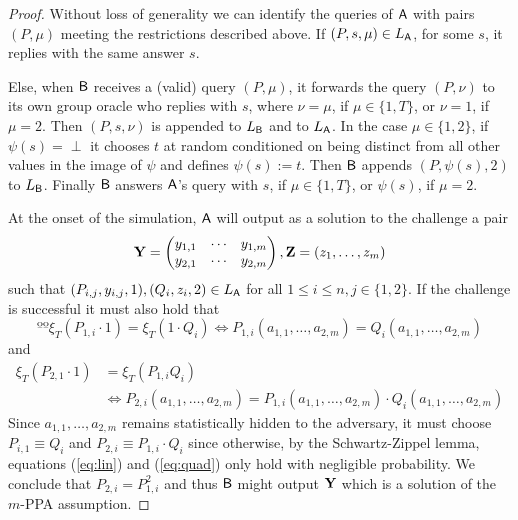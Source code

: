 \begin{proof}
Without loss of generality we can identify the queries of $\mathsf{A}$ with 
pairs $(P,\mu)$ meeting the restrictions described above. If $(P,s,\mu)\in L_{\mathsf{A}}$, for some $s$, it replies with the same answer $s$.

Else, when $\mathsf{B}$ receives a (valid) query $(P,\mu)$, it forwards the query $(P,\nu)$ to its own group oracle who replies with $s$, where $\nu=\mu$, if $\mu\in\{1,T\}$, or $\nu=1$, if $\mu=2$. Then $(P,s,\nu)$ is appended to $L_{\mathsf{B}}$ and to $L_{\mathsf{A}}$. In the case $\mu\in\{1,2\}$, if $\psi(s)=\perp$ it chooses $t$ at random conditioned on being distinct from all other values in the image of $\psi$ and defines $\psi(s):=t$. 
Then $\mathsf{B}$ appends $(P,\psi(s),2)$ to $L_{\mathsf{B}}$. Finally $\mathsf{B}$ answers $\mathsf{A}$'s query with $s$, if $\mu\in\{1,T\}$,  or $\psi(s)$, if $\mu=2$. 


At the onset of the simulation, $\mathsf{A}$ will output as a solution to the challenge a pair
$$
\mathbf{{Y}}=\left(\begin{matrix}y_{1,1}&\cdots&y_{1,m}\\y_{2,1}&\cdots&y_{2,m}\end{matrix}\right),\mathbf{{Z}} = (z_1,\ldots,z_m)
$$
such that 
$(P_{i,j},y_{i,j},1),(Q_{i},z_i,2) \in L_{\mathsf{A}}$ for all $1\leq i\leq n,j\in\{1,2\}$. If the challenge is successful it must also hold that
\begin{equation}ºº
\xi_T(P_{1,i}\cdot 1)=\xi_T(1\cdot Q_i) \Longleftrightarrow P_{1,i}(a_{1,1},\ldots,a_{2,m})=Q_{i}(a_{1,1},\ldots,a_{2,m})
\label{eq:lin}
\end{equation}
and
\begin{align}
	\xi_T(P_{2,1}\cdot 1) &=\xi_T(P_{1,i}Q_i) \nonumber\\
	&\Longleftrightarrow P_{2,i}(a_{1,1},\ldots,a_{2,m})=P_{1,i}(a_{1,1},\ldots,a_{2,m})\cdot Q_{i}(a_{1,1},\ldots,a_{2,m})
	\label{eq:quad}
\end{align}
Since $a_{1,1},\ldots,a_{2,m}$ remains statistically hidden to the adversary, it must choose $P_{i,1}\equiv Q_i$ and $P_{2,i}\equiv P_{1,i}\cdot Q_i$ since otherwise, by the Schwartz-Zippel lemma, equations (\ref{eq:lin}) and (\ref{eq:quad}) only hold with negligible probability. We conclude that $P_{2,i}=P^2_{1,i}$ and thus $\mathsf{B}$ might output $\mathbf{{Y}}$ which is a solution of the $m$-PPA assumption.
\end{proof}


